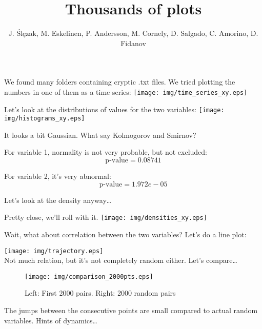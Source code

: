 \documentclass{beamer}
\begin{document}
\title{Thousands of plots} %
\author{J. \'Sl\k{e}zak,  M. Eskelinen, P. Andersson, M. Cornely, D. Salgado, C. Amorino, D. Fidanov}

\begin{frame}
\maketitle
\end{frame}

\begin{frame}
We found many folders containing cryptic .txt files. We tried plotting the numbers in one of them as a time series:
\centering
\texttt{[image: img/time\_series\_xy.eps]}
\end{frame}

\begin{frame}
Let's look at the distributions of values for the two variables:
\centering
\texttt{[image: img/histograms\_xy.eps]}
\end{frame}

\begin{frame}
It looks a bit Gaussian. What say Kolmogorov and Smirnov?

For variable 1, normality is not very probable, but not excluded:
\[
\text{p-value} = 0.08741
\]

For variable 2, it's very abnormal:
\[
\text{p-value} = 1.972e-05
\]

Let's look at the density anyway\dots
\end{frame}

\begin{frame}
Pretty close, we'll roll with it.
\centering
\texttt{[image: img/densities\_xy.eps]}
\end{frame}

\begin{frame}
Wait, what about correlation between the two variables? Let's do a line plot:

\centering
\texttt{[image: img/trajectory.eps]}\\
Not much relation, but it's not completely random either. Let's compare\dots
\end{frame}

\begin{frame}
\begin{figure}
\centering
\texttt{[image: img/comparison\_2000pts.eps]}
\caption{Left: First 2000 pairs. Right: 2000 random pairs}
\end{figure}
The jumps between the consecutive points are small compared to actual random variables. Hints of dynamics\dots

\end{frame}
\end{document}
